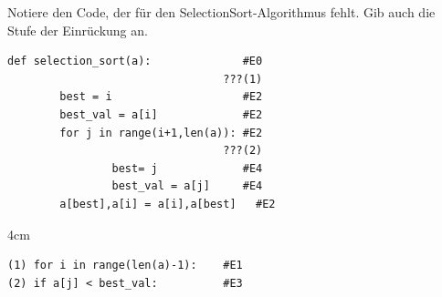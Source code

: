 \question[4]
Notiere den Code, der für den SelectionSort-Algorithmus fehlt.
Gib auch die Stufe der Einrückung an.
\begin{lstlisting}
def selection_sort(a):              #E0
                                 ???(1)
        best = i                    #E2
        best_val = a[i]             #E2
        for j in range(i+1,len(a)): #E2
                                 ???(2)
                best= j             #E4
                best_val = a[j]     #E4
        a[best],a[i] = a[i],a[best]   #E2

\end{lstlisting}
\begin{solutionbox}{4cm}
\begin{lstlisting}
(1) for i in range(len(a)-1):    #E1
(2) if a[j] < best_val:          #E3
\end{lstlisting}
\end{solutionbox}
